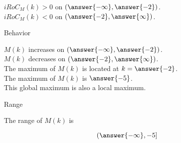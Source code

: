 \documentclass{ximera}
\begin{document}
\begin{exercise}
\begin{question}
$iRoC_M(k) > 0$ on $\left( \answer{-\infty}, \answer{-2} \right)$. \\


$iRoC_M(k) < 0$ on $\left( \answer{-2}, \answer{\infty} \right)$. \\

\end{question}





\begin{question} Behavior



$M(k)$ increases on $\left( \answer{-\infty}, \answer{-2} \right)$. \\


$M(k)$ decreases on $\left( \answer{-2}, \answer{\infty} \right)$. \\


The maximum of $M(k)$ is located at  $k = \answer{-2}$. \\


The maximum of $M(k)$ is $\answer{-5}$. \\


This global maximum is also a local maximum.

\end{question}










\begin{question} Range



The range of $M(k)$ is 

\[
\left( \answer{-\infty}, -5 \right]
\]



\end{question}









\end{exercise}
\end{document}
